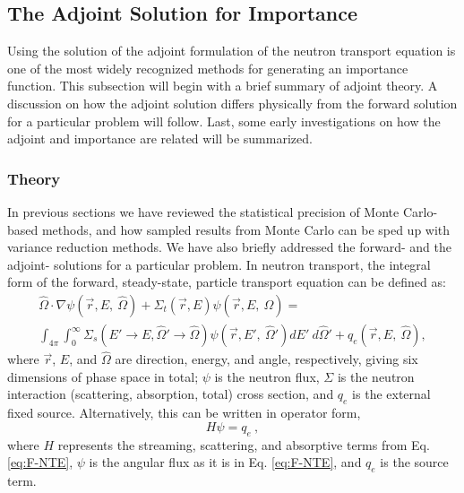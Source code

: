 \subsection{The Adjoint Solution for Importance}
\label{sec:AdjointImportance}

Using the solution of the adjoint formulation of the neutron transport
equation is one of the most widely recognized methods for generating
an importance function. This subsection will begin with a brief summary of
adjoint theory. A discussion on how
the adjoint solution differs physically from the forward solution for a
particular problem will follow. Last, some early investigations on how the
adjoint
and importance are related will be summarized.

\subsubsection{Theory}

In previous sections we have reviewed the statistical precision of Monte
Carlo-based methods, and how sampled results from Monte Carlo can be sped up
with variance reduction methods. We have also briefly addressed the forward- and
the adjoint- solutions for a particular problem. In neutron transport, the
integral form of the forward, steady-state, particle transport equation can be
defined as:
\begin{multline}
\hat\Omega \cdot \nabla \psi
        (\vec {r} ,E,\:\hat\Omega)+\Sigma _{ t }
        (\vec{r},E)\psi (\vec { r } ,E,\:\hat\Omega) = \\
        \int _{ 4\pi  } \int _{ 0 }^{ \infty  } \Sigma _{ s }(E'\rightarrow E,
        \hat\Omega'\rightarrow\hat\Omega)\psi (\vec { r } ,E',\: \hat\Omega')dE'
        \:d\hat\Omega' + q_{e}(\vec { r } ,E, \:\hat\Omega),
\label{eq:F-NTE}
\end{multline}
where $\vec { r }$, $E$, and $\hat\Omega$ are direction, energy, and angle, respectively, giving six dimensions of phase space in total;
$\psi$ is the neutron flux, $\Sigma$ is the neutron
interaction (scattering, absorption, total) cross section, and $q_{e}$ is the
external fixed source. Alternatively, this can be written in operator form,
\begin{equation}
  H \psi = q_{e}\:,
\label{eq:F-NTE2}
\end{equation}
where $H$ represents the streaming, scattering, and absorptive terms from Eq.
\eqref{eq:F-NTE}, $\psi$ is the angular flux as it is in Eq. \eqref{eq:F-NTE}, and
$q_{e}$ is the source term. 


